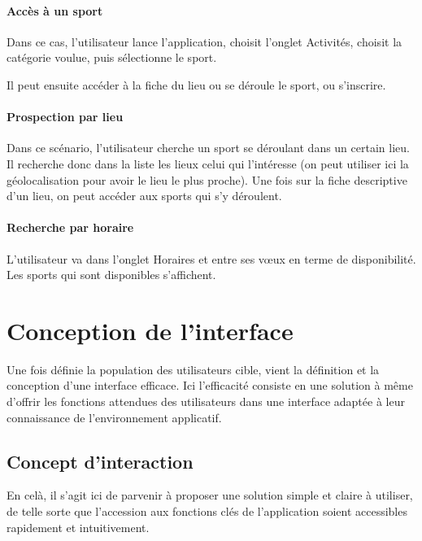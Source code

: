 \documentclass[french, titlepage, 11pt, a4paper]{article}
\begin{document}
        \paragraph{Accès à un sport}

            Dans ce cas, l'utilisateur lance l'application, choisit l'onglet
            Activités, choisit la catégorie voulue, puis sélectionne le sport.

            Il peut ensuite accéder à la fiche du lieu ou se déroule le sport, ou s'inscrire.

        \paragraph{Prospection par lieu}

            Dans ce scénario, l'utilisateur cherche un sport se déroulant dans un
            certain lieu. Il recherche donc dans la liste les lieux celui qui
            l'intéresse (on peut utiliser ici la géolocalisation pour avoir le
            lieu le plus proche). Une fois sur la fiche descriptive d'un lieu,
            on peut accéder aux sports qui s'y déroulent.

        \paragraph{Recherche par horaire}

            L'utilisateur va dans l'onglet \og Horaires\fg{} et entre ses vœux
            en terme de disponibilité. Les sports qui sont disponibles s'affichent.

\section{Conception de l'interface}

	Une fois définie la population des utilisateurs cible, vient la définition et
	la conception d'une interface efficace.
	Ici l'efficacité consiste en une solution à même d'offrir les fonctions
	attendues des utilisateurs dans une interface adaptée à leur connaissance de
	l'environnement applicatif.

	\subsection{Concept d'interaction}

	En celà, il s'agit ici de parvenir à proposer une solution simple et claire à
	utiliser, de telle sorte que l'accession aux fonctions clés de l'application
	soient accessibles rapidement et intuitivement.
\end{document}
